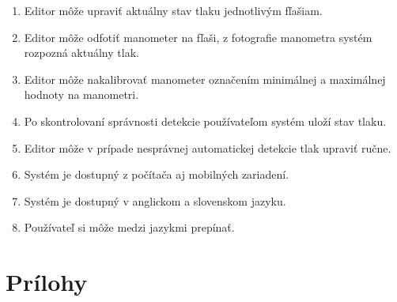 \documentclass[hreffootnote]{zah}
\begin{document}
\begin{enumerate}
\item Editor môže upraviť aktuálny stav tlaku jednotlivým fľašiam.
\item Editor môže odfotiť manometer na fľaši, z fotografie manometra systém rozpozná aktuálny tlak.
\item Editor môže nakalibrovať manometer označením minimálnej a maximálnej hodnoty na manometri.
\item Po skontrolovaní správnosti detekcie používateľom systém uloží stav tlaku.
\item Editor môže v prípade nesprávnej automatickej detekcie tlak upraviť ručne.

\item Systém je dostupný z počítača aj mobilných zariadení.
\item Systém je dostupný v anglickom a slovenskom jazyku.
\item Používateľ si môže medzi jazykmi prepínať.
\end{enumerate}

\label{reqs}

\cleardoublepage
\section{Prílohy}
\end{document}
